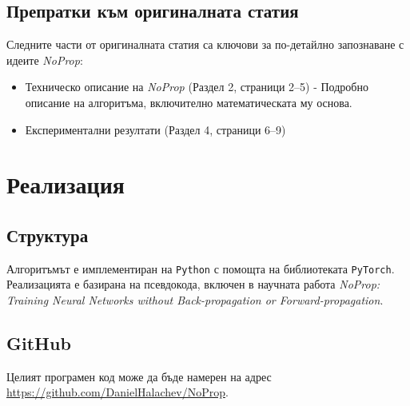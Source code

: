 \documentclass[a4paper,11pt]{article}
\begin{document}
\subsection{Препратки към оригиналната статия}

Следните части от оригиналната статия са ключови за по-детайлно запознаване с идеите  \emph{NoProp}:

\begin{itemize}
    \item Техническо описание на \emph{NoProp} (Раздел 2, страници 2–5) - 
Подробно описание на алгоритъма, включително математическата му основа.
    \item Експериментални резултати (Раздел 4, страници 6–9)
\end{itemize}

\section{Реализация}
\subsection{Структура}
Алгоритъмът е имплементиран на \lstinline{Python} с помощта на библиотеката \lstinline{PyTorch}. Реализацията е базирана на псевдокода, включен в научната работа \textit{NoProp: Training Neural Networks without Back-propagation or Forward-propagation}.\cite{li2025noproptrainingneuralnetworks}
\subsection{GitHub}
Целият програмен код може да бъде намерен на адрес \url{https://github.com/DanielHalachev/NoProp}.
\newpage
\end{document}
